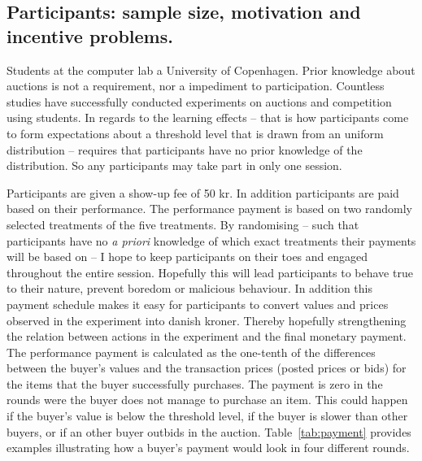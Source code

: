 \documentclass[a4paper,12pt]{article}
\begin{document}
	\subsection{Participants: sample size, motivation and incentive problems.}
	Students at the computer lab a University of Copenhagen. Prior knowledge about auctions is not a requirement, nor a impediment to participation. Countless studies have successfully conducted experiments on auctions and competition using students. In regards to the learning effects -- that is how participants come to form expectations about a threshold level that is drawn from an uniform distribution -- requires that participants have no prior knowledge of the distribution. So any participants may take part in only one session.
	
	Participants are given a show-up fee of 50 kr. In addition participants are paid based on their performance. The performance payment is based on two randomly selected treatments of the five treatments. By randomising -- such that participants have no \emph{a priori} knowledge of which exact treatments their payments will be based on -- I hope to keep participants on their toes and engaged throughout the entire session. Hopefully this will lead participants to behave true to their nature, prevent boredom or malicious behaviour. In addition this payment schedule makes it easy for participants to convert values and prices observed in the experiment into danish kroner. Thereby hopefully strengthening the relation between actions in the experiment and the final monetary payment. The performance payment is calculated as the one-tenth of the differences between the buyer's values and the transaction prices (posted prices or bids) for the items that the buyer successfully purchases. The payment is zero in the rounds were the buyer does not manage to purchase an item. This could happen if the buyer's value is below the threshold level, if the buyer is slower than other buyers, or if an other buyer outbids in the auction. Table~\ref{tab:payment} provides examples illustrating how a buyer's payment would look in four different rounds.
	
\end{document}
